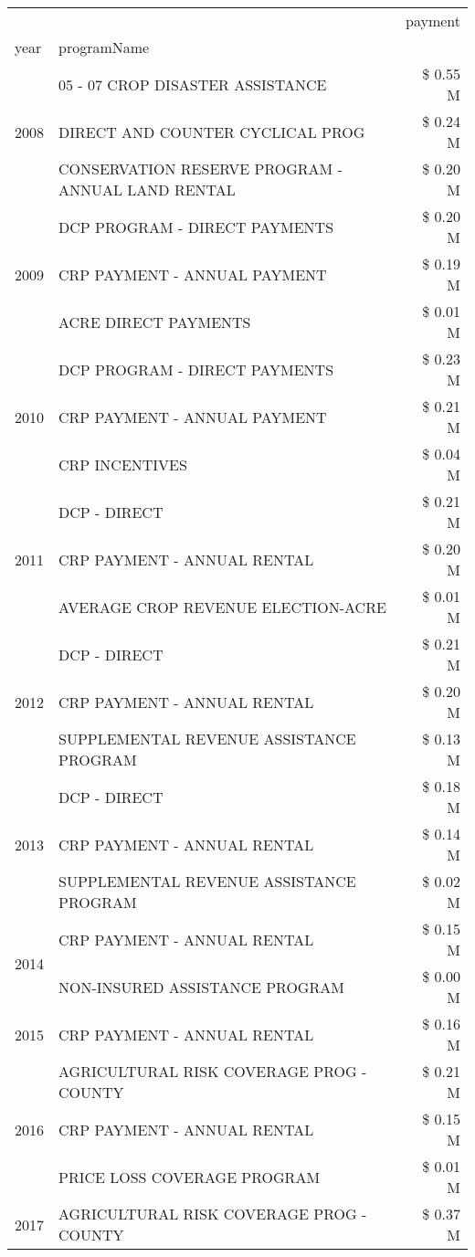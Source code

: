 \begin{tabular}{llr}
\toprule
 &  & payment \\
year & programName &  \\
\midrule
\multirow[t]{3}{*}{2008} & 05 - 07 CROP DISASTER ASSISTANCE & \$ 0.55 M \\
 & DIRECT AND COUNTER CYCLICAL PROG & \$ 0.24 M \\
 & CONSERVATION RESERVE PROGRAM - ANNUAL LAND RENTAL & \$ 0.20 M \\
\cline{1-3}
\multirow[t]{3}{*}{2009} & DCP PROGRAM - DIRECT PAYMENTS & \$ 0.20 M \\
 & CRP PAYMENT - ANNUAL PAYMENT & \$ 0.19 M \\
 & ACRE DIRECT PAYMENTS & \$ 0.01 M \\
\cline{1-3}
\multirow[t]{3}{*}{2010} & DCP PROGRAM - DIRECT PAYMENTS & \$ 0.23 M \\
 & CRP PAYMENT - ANNUAL PAYMENT & \$ 0.21 M \\
 & CRP INCENTIVES & \$ 0.04 M \\
\cline{1-3}
\multirow[t]{3}{*}{2011} & DCP - DIRECT & \$ 0.21 M \\
 & CRP PAYMENT - ANNUAL RENTAL & \$ 0.20 M \\
 & AVERAGE CROP REVENUE ELECTION-ACRE & \$ 0.01 M \\
\cline{1-3}
\multirow[t]{3}{*}{2012} & DCP - DIRECT & \$ 0.21 M \\
 & CRP PAYMENT - ANNUAL RENTAL & \$ 0.20 M \\
 & SUPPLEMENTAL REVENUE ASSISTANCE PROGRAM & \$ 0.13 M \\
\cline{1-3}
\multirow[t]{3}{*}{2013} & DCP - DIRECT & \$ 0.18 M \\
 & CRP PAYMENT - ANNUAL RENTAL & \$ 0.14 M \\
 & SUPPLEMENTAL REVENUE ASSISTANCE PROGRAM & \$ 0.02 M \\
\cline{1-3}
\multirow[t]{2}{*}{2014} & CRP PAYMENT - ANNUAL RENTAL & \$ 0.15 M \\
 & NON-INSURED ASSISTANCE PROGRAM & \$ 0.00 M \\
\cline{1-3}
2015 & CRP PAYMENT - ANNUAL RENTAL & \$ 0.16 M \\
\cline{1-3}
\multirow[t]{3}{*}{2016} & AGRICULTURAL RISK COVERAGE PROG - COUNTY & \$ 0.21 M \\
 & CRP PAYMENT - ANNUAL RENTAL & \$ 0.15 M \\
 & PRICE LOSS COVERAGE PROGRAM & \$ 0.01 M \\
\cline{1-3}
\multirow[t]{3}{*}{2017} & AGRICULTURAL RISK COVERAGE PROG - COUNTY & \$ 0.37 M \\

\end{tabular}
